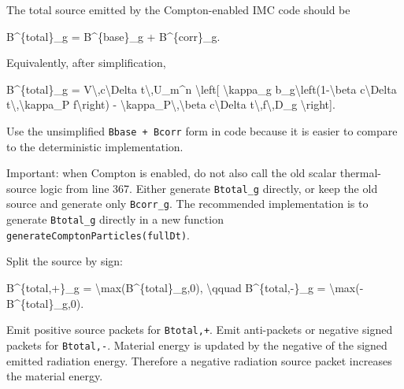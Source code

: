 \documentclass[
]{article}
\newenvironment{Shaded}{}{}
\newcommand{\NormalTok}[1]{#1}
\begin{document}
The total source emitted by the Compton-enabled IMC code should be

\begin{Shaded}
\begin{Highlighting}[]
\NormalTok{B\^{}\{total\}\_g = B\^{}\{base\}\_g + B\^{}\{corr\}\_g.}
\end{Highlighting}
\end{Shaded}

Equivalently, after simplification,

\begin{Shaded}
\begin{Highlighting}[]
\NormalTok{B\^{}\{total\}\_g}
\NormalTok{= V\textbackslash{},c\textbackslash{}Delta t\textbackslash{},U\_m\^{}n}
\NormalTok{  \textbackslash{}left[}
\NormalTok{      \textbackslash{}kappa\_g b\_g\textbackslash{}left(1{-}\textbackslash{}beta c\textbackslash{}Delta t\textbackslash{},\textbackslash{}kappa\_P f\textbackslash{}right)}
\NormalTok{      {-} \textbackslash{}kappa\_P\textbackslash{},\textbackslash{}beta c\textbackslash{}Delta t\textbackslash{},f\textbackslash{},D\_g}
\NormalTok{  \textbackslash{}right].}
\end{Highlighting}
\end{Shaded}

Use the unsimplified \texttt{Bbase\ +\ Bcorr} form in code because it is
easier to compare to the deterministic implementation.

Important: when Compton is enabled, do not also call the old scalar
thermal-source logic from line 367. Either generate \texttt{Btotal\_g}
directly, or keep the old source and generate only \texttt{Bcorr\_g}.
The recommended implementation is to generate \texttt{Btotal\_g}
directly in a new function \texttt{generateComptonParticles(fullDt)}.

Split the source by sign:

\begin{Shaded}
\begin{Highlighting}[]
\NormalTok{B\^{}\{total,+\}\_g = \textbackslash{}max(B\^{}\{total\}\_g,0),}
\NormalTok{\textbackslash{}qquad}
\NormalTok{B\^{}\{total,{-}\}\_g = \textbackslash{}max({-}B\^{}\{total\}\_g,0).}
\end{Highlighting}
\end{Shaded}

Emit positive source packets for \texttt{Btotal,+}. Emit anti-packets or
negative signed packets for \texttt{Btotal,-}. Material energy is
updated by the negative of the signed emitted radiation energy.
Therefore a negative radiation source packet increases the material
energy.
\end{document}
